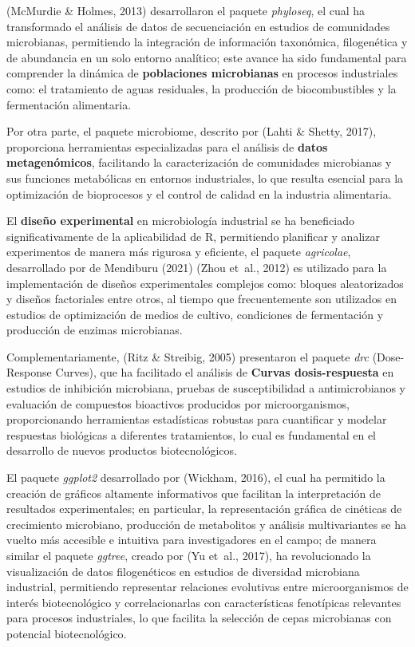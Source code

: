 \documentclass[
  spanish,
  letterpaper,
  DIV=11,
  numbers=noendperiod]{scrreprt}
\begin{document}
(McMurdie \& Holmes, 2013) desarrollaron el paquete \emph{phyloseq}, el
cual ha transformado el análisis de datos de secuenciación en estudios
de comunidades microbianas, permitiendo la integración de información
taxonómica, filogenética y de abundancia en un solo entorno analítico;
este avance ha sido fundamental para comprender la dinámica de
\textbf{poblaciones microbianas} en procesos industriales como: el
tratamiento de aguas residuales, la producción de biocombustibles y la
fermentación alimentaria.

Por otra parte, el paquete microbiome, descrito por (Lahti \& Shetty,
2017), proporciona herramientas especializadas para el análisis de
\textbf{datos metagenómicos}, facilitando la caracterización de
comunidades microbianas y sus funciones metabólicas en entornos
industriales, lo que resulta esencial para la optimización de
bioprocesos y el control de calidad en la industria alimentaria.

El \textbf{diseño experimental} en microbiología industrial se ha
beneficiado significativamente de la aplicabilidad de R, permitiendo
planificar y analizar experimentos de manera más rigurosa y eficiente,
el paquete \emph{agricolae}, desarrollado por de Mendiburu (2021) (Zhou
et~al., 2012) es utilizado para la implementación de diseños
experimentales complejos como: bloques aleatorizados y diseños
factoriales entre otros, al tiempo que frecuentemente son utilizados en
estudios de optimización de medios de cultivo, condiciones de
fermentación y producción de enzimas microbianas.

Complementariamente, (Ritz \& Streibig, 2005) presentaron el paquete
\emph{drc} (Dose-Response Curves), que ha facilitado el análisis de
\textbf{Curvas dosis-respuesta} en estudios de inhibición microbiana,
pruebas de susceptibilidad a antimicrobianos y evaluación de compuestos
bioactivos producidos por microorganismos, proporcionando herramientas
estadísticas robustas para cuantificar y modelar respuestas biológicas a
diferentes tratamientos, lo cual es fundamental en el desarrollo de
nuevos productos biotecnológicos.

El paquete \emph{ggplot2} desarrollado por (Wickham, 2016), el cual ha
permitido la creación de gráficos altamente informativos que facilitan
la interpretación de resultados experimentales; en particular, la
representación gráfica de cinéticas de crecimiento microbiano,
producción de metabolitos y análisis multivariantes se ha vuelto más
accesible e intuitiva para investigadores en el campo; de manera similar
el paquete \emph{ggtree}, creado por (Yu et~al., 2017), ha revolucionado
la visualización de datos filogenéticos en estudios de diversidad
microbiana industrial, permitiendo representar relaciones evolutivas
entre microorganismos de interés biotecnológico y correlacionarlas con
características fenotípicas relevantes para procesos industriales, lo
que facilita la selección de cepas microbianas con potencial
biotecnológico.
\end{document}
